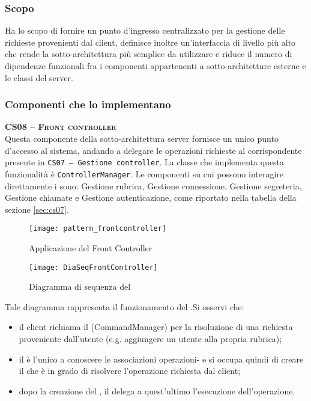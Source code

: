 \subsubsection{Scopo}
Ha lo scopo di fornire un punto d'ingresso centralizzato per la gestione delle richieste provenienti dal client, definisce inoltre un'interfaccia di livello più alto che rende la sotto-architettura più semplice da utilizzare e riduce il numero di dipendenze funzionali fra i componenti appartenenti a sotto-architetture esterne e le classi del server.

\subsubsection{Componenti che lo implementano}
\begin{description}
  \item{\scshape\bfseries CS08 -- Front controller}\\
Questa componente della sotto-architettura server fornisce un unico punto d'accesso al sistema, andando a delegare le operazioni richieste al corrispondente  presente in \texttt{CS07 -- Gestione controller}. La classe che implementa questa funzionalità è \texttt{ControllerManager}. Le componenti su cui possono interagire direttamente i  sono: \textsf{Gestione rubrica}, \textsf{Gestione connessione}, \textsf{Gestione segreteria}, \textsf{Gestione chiamate} e \textsf{Gestione autenticazione}, come riportato nella tabella della sezione \vref{sec:cs07}.
\end{description}


\begin{figure}[H]
  \centering
  \texttt{[image: pattern\_frontcontroller]}
  \caption{Applicazione del  Front Controller}\label{fig:dao}
\end{figure}



\begin{figure}[H]
  \centering
  \texttt{[image: DiaSeqFrontController]}
  \caption{Diagramma di sequenza del }\label{fig:front_controller_seq}
\end{figure}

Tale diagramma rappresenta il funzionamento del .Si osservi che:
	\begin{itemize}
		\item il client richiama il  (CommandManager) per la risoluzione di una richiesta proveniente dall'utente (e.g. aggiungere un utente alla propria rubrica);
		\item il  è l'unico a conoscere le associazioni operazioni- e si occupa quindi di creare il  che è in grado di risolvere l'operazione richiesta dal client;
		\item dopo la creazione del , il  delega a quest'ultimo l'esecuzione dell'operazione.
	\end{itemize}

